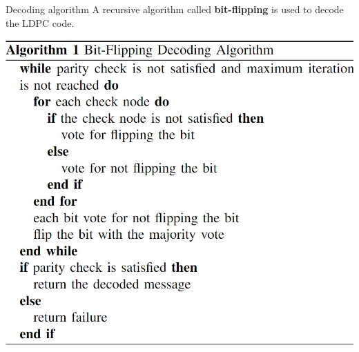 \documentclass{beamer}
\begin{document}
\begin{frame}{Decoding algorithm}
  A recursive algorithm called \textbf{bit-flipping} is used to decode the LDPC code.

  \includegraphics[scale=0.3]{Images/Bit_Flipping_Algorithm.jpg}

\end{frame}
\end{document}
